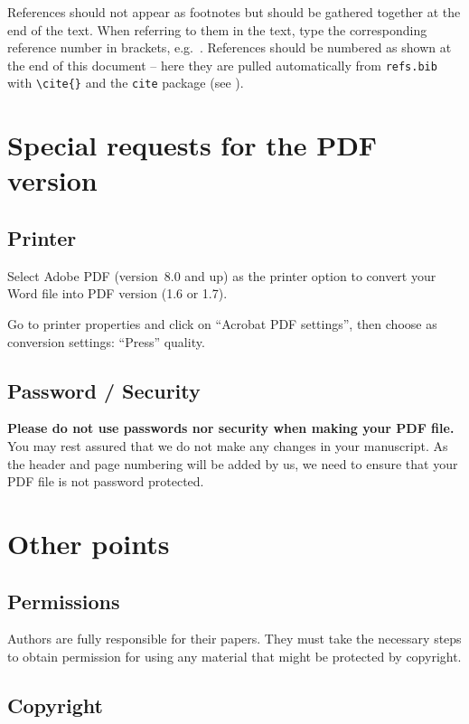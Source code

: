 \documentclass{eupvsec}
\begin{document}
References should not appear as footnotes but should be gathered
together at the end of the text. When referring to them in the text,
type the corresponding reference number in brackets, e.g.\
\cite{smith2002}. References should be numbered as shown at the end of
this document -- here they are pulled automatically from
\texttt{refs.bib} with \verb|\cite{}| and the \texttt{cite} package
(see \cite{smith2002,boer1996}).

\section{Special requests for the PDF version}

\subsection{Printer}

Select Adobe PDF (version~8.0 and up) as the printer option to convert
your Word file into PDF version (1.6 or 1.7).

Go to printer properties and click on ``Acrobat PDF settings'', then
choose as conversion settings: ``Press'' quality.

\subsection{Password / Security}

\textbf{Please do not use passwords nor security when making your PDF
file.} You may rest assured that we do not make any changes in your
manuscript. As the header and page numbering will be added by us, we
need to ensure that your PDF file is not password protected.

\section{Other points}

\subsection{Permissions}

Authors are fully responsible for their papers. They must take the
necessary steps to obtain permission for using any material that
might be protected by copyright.

\subsection{Copyright}
\end{document}

